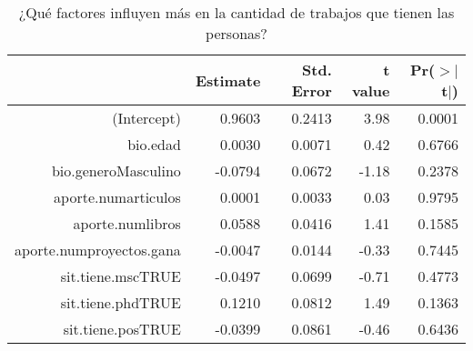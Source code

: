 \begin{table}[ht]
\centering
\begin{tabular}{rrrrr}
  \hline
 & Estimate & Std. Error & t value & Pr($>$$|$t$|$) \\ 
  \hline
(Intercept) & 0.9603 & 0.2413 & 3.98 & 0.0001 \\ 
  bio.edad & 0.0030 & 0.0071 & 0.42 & 0.6766 \\ 
  bio.generoMasculino & -0.0794 & 0.0672 & -1.18 & 0.2378 \\ 
  aporte.numarticulos & 0.0001 & 0.0033 & 0.03 & 0.9795 \\ 
  aporte.numlibros & 0.0588 & 0.0416 & 1.41 & 0.1585 \\ 
  aporte.numproyectos.gana & -0.0047 & 0.0144 & -0.33 & 0.7445 \\ 
  sit.tiene.mscTRUE & -0.0497 & 0.0699 & -0.71 & 0.4773 \\ 
  sit.tiene.phdTRUE & 0.1210 & 0.0812 & 1.49 & 0.1363 \\ 
  sit.tiene.posTRUE & -0.0399 & 0.0861 & -0.46 & 0.6436 \\ 
   \hline
\end{tabular}
\caption{¿Qué factores influyen más en la cantidad de trabajos que tienen las personas?} 
\label{tab:reg2}
\end{table}
